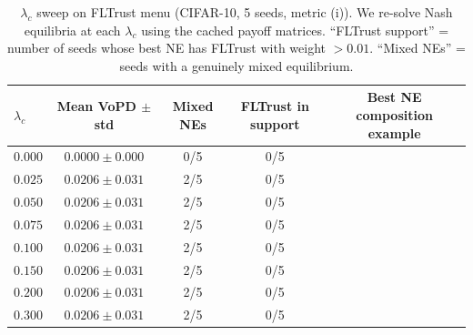 \begin{table}[h]
\caption{$\lambda_c$ sweep on FLTrust menu (CIFAR-10, 5 seeds, metric (i)). We re-solve Nash equilibria at each $\lambda_c$ using the cached payoff matrices. ``FLTrust support'' = number of seeds whose best NE has FLTrust with weight $>0.01$. ``Mixed NEs'' = seeds with a genuinely mixed equilibrium.}
\label{tab:lambda_c_sweep}
\centering\small
\begin{tabular}{lcccc}
\toprule
$\lambda_c$ & Mean VoPD $\pm$ std & Mixed NEs & FLTrust in support & Best NE composition example \\
\midrule
$0.000$ & $0.0000\pm0.000$ & 0/5 & 0/5 &  \\
$0.025$ & $0.0206\pm0.031$ & 2/5 & 0/5 &  \\
$0.050$ & $0.0206\pm0.031$ & 2/5 & 0/5 &  \\
$0.075$ & $0.0206\pm0.031$ & 2/5 & 0/5 &  \\
$0.100$ & $0.0206\pm0.031$ & 2/5 & 0/5 &  \\
$0.150$ & $0.0206\pm0.031$ & 2/5 & 0/5 &  \\
$0.200$ & $0.0206\pm0.031$ & 2/5 & 0/5 &  \\
$0.300$ & $0.0206\pm0.031$ & 2/5 & 0/5 &  \\
\bottomrule
\end{tabular}
\end{table}